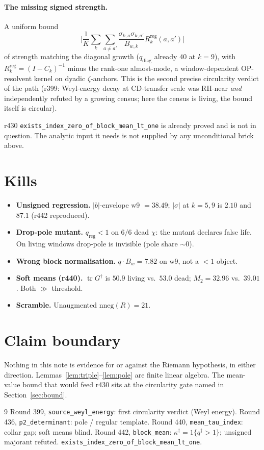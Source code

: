 \documentclass[11pt]{article}
\theoremstyle{remark}
\newcommand{\qd}{q^{\dagger}}
\newcommand{\kapd}{\kappa^{\dagger}}
\begin{document}
\paragraph{The missing signed strength.}
A uniform bound
\[
\Biggl|
\frac1K\sum_k\sum_{a\neq a'}
\frac{\sigma_{k,a}\sigma_{k,a'}}{B_{w,k}}
R^{\mathrm{reg}}_k(a,a')
\Biggr|
\]
of strength matching the diagonal growth
($q_{\mathrm{diag}}$ already $40$ at $k=9$), with
$R^{\mathrm{reg}}_k=(I-C_k)^{-1}$ minus the rank-one
almost-mode, a window-dependent OP-resolvent kernel on
dyadic $\zeta$-anchors.
This is the second precise circularity verdict of the
path (r399: Weyl-energy decay at CD-transfer scale was
RH-near \emph{and} independently refuted by a growing
census; here the census is living, the bound itself is
circular).

r430 \texttt{exists\_index\_zero\_of\_block\_mean\_lt\_one}
is already proved and is not in question.  The analytic
input it needs is not supplied by any unconditional
brick above.

\section{Kills}\label{sec:kills}

\begin{itemize}
\item \textbf{Unsigned regression.}
$|b|$-envelope w9 $=38.49$; $|\sigma|$ at $k=5,9$ is
$2.10$ and $87.1$ (r442 reproduced).
\item \textbf{Drop-pole mutant.}
$q_{\mathrm{reg}}<1$ on $6/6$ dead $\chi$: the mutant
declares false life.  On living windows drop-pole is
invisible (pole share $\sim 0$).
\item \textbf{Wrong block normalisation.}
$q\cdot B_w=7.82$ on w9, not a $<1$ object.
\item \textbf{Soft means (r440).}
$\operatorname{tr}G^{\dagger}$ is $50.9$ living vs.\ $53.0$
dead; $M_2=32.96$ vs.\ $39.01$.  Both $\gg$ threshold.
\item \textbf{Scramble.}
Unaugmented $\mathrm{nneg}(R)=21$.
\end{itemize}

\section*{Claim boundary}

Nothing in this note is evidence for or against the
Riemann hypothesis, in either direction.
Lemmas~\ref{lem:triple}--\ref{lem:pole} are finite linear
algebra.  The mean-value bound that would feed r430 sits
at the circularity gate named in Section~\ref{sec:bound}.

\begin{thebibliography}{9}
 Round 399, \texttt{source\_weyl\_energy}:
  first circularity verdict (Weyl energy).
 Round 436, \texttt{p2\_determinant}:
  pole / regular template.
 Round 440, \texttt{mean\_tau\_index}:
  collar gap; soft means blind.
 Round 442, \texttt{block\_mean}:
  $\kapd=1\{\qd>1\}$; unsigned majorant refuted.
 \texttt{exists\_index\_zero\_of\_block\_mean\_lt\_one}.
\end{thebibliography}
\end{document}
